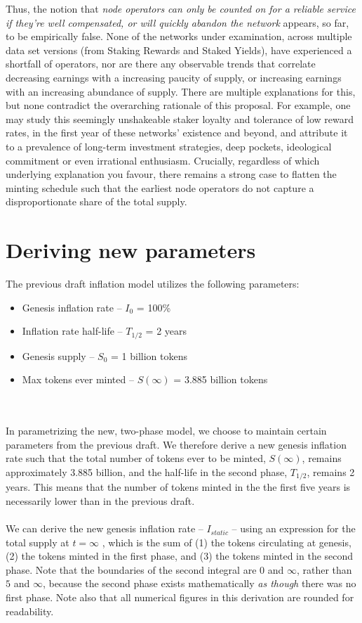 \documentclass[8pt]{article}
\begin{document}
Thus, the notion that \textit{node operators can only be counted on for a reliable service if they're well compensated, or will quickly abandon the network} appears, so far, to be empirically false. None of the networks under examination, across multiple data set versions (from Staking Rewards and Staked Yields), have experienced a shortfall of operators, nor are there any observable trends that correlate decreasing earnings with a increasing paucity of supply, or increasing earnings with an increasing abundance of supply. There are multiple explanations for this, but none contradict the overarching rationale of this proposal. For example, one may study this seemingly unshakeable staker loyalty and tolerance of low reward rates, in the first year of these networks' existence and beyond, and attribute it to a prevalence of long-term investment strategies, deep pockets, ideological commitment or even irrational enthusiasm. Crucially, regardless of which underlying explanation you favour, there remains a strong case to flatten the minting schedule such that the earliest node operators do not capture a disproportionate share of the total supply.

\section{Deriving new parameters}

The previous draft inflation model utilizes the following parameters:
\begin{itemize}
    \item Genesis inflation rate – $I_0$ = 100\%
    \item Inflation rate half-life – $T_{1/2}$ = 2 years
    \item Genesis supply – $S_0$ = 1 billion tokens 
    \item Max tokens ever minted – $S(\infty)$ = 3.885 billion tokens
\end{itemize}
\\\\
In parametrizing the new, two-phase model, we choose to maintain certain parameters from the previous draft. We therefore derive a new genesis inflation rate such that the total number of tokens ever to be minted, $S(\infty)$, remains approximately 3.885 billion, and the half-life in the second phase, $T_{1/2}$, remains 2 years. This means that the number of tokens minted in the the first five years is necessarily lower than in the previous draft. 
\\\\
We can derive the new genesis inflation rate – $I_{static}$ – using an expression for the total supply at $t=\infty$ , which is the sum of (1) the tokens circulating at genesis, (2) the tokens minted in the first phase, and (3) the tokens minted in the second phase. Note that the boundaries of the second integral are $0$ and $\infty$, rather than $5$ and $\infty$, because the second phase exists mathematically \textit{as though} there was no first phase. Note also that all numerical figures in this derivation are rounded for readability.
\end{document}
